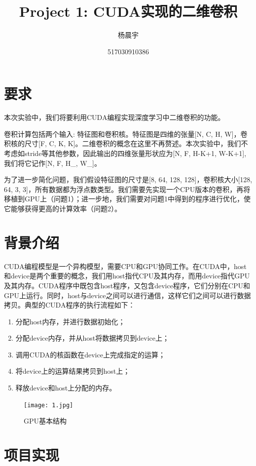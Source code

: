 \documentclass{article}
\title{Project 1: CUDA实现的二维卷积}
\author{杨晨宇}
\date{517030910386}
\begin{document}
\maketitle

\section{要求}
本次实验中，我们将要利用CUDA编程实现深度学习中二维卷积的功能。

卷积计算包括两个输入: 特征图和卷积核。特征图是四维的张量[N, C, H, W]，卷积核的尺寸[F, C, K, K]。二维卷积的概念在这里不再赘述。本次实验中，我们不考虑如stride等其他参数，因此输出的四维张量形状应为[N, F, H-K+1, W-K+1], 我们将它记作[N, F, H\_, W\_]。

为了进一步简化问题，我们假设特征图的尺寸是[8, 64, 128, 128]，卷积核大小[128, 64, 3, 3]，所有数据都为浮点数类型。我们需要先实现一个CPU版本的卷积，再将移植到GPU上（问题1）；进一步地，我们需要对问题1中得到的程序进行优化，使它能够获得更高的计算效率（问题2）。


\section{背景介绍}
CUDA编程模型是一个异构模型，需要CPU和GPU协同工作。在CUDA中，host和device是两个重要的概念，我们用host指代CPU及其内存，而用device指代GPU及其内存。CUDA程序中既包含host程序，又包含device程序，它们分别在CPU和GPU上运行。同时，host与device之间可以进行通信，这样它们之间可以进行数据拷贝。典型的CUDA程序的执行流程如下：
\begin{enumerate}
	\item 分配host内存，并进行数据初始化；
	\item 分配device内存，并从host将数据拷贝到device上；
	\item 调用CUDA的核函数在device上完成指定的运算；
	\item 将device上的运算结果拷贝到host上；
	\item 释放device和host上分配的内存。
\end{enumerate}
\begin{figure}[h]
	\centering
	\texttt{[image: 1.jpg]}
	\caption{GPU基本结构}
	\label{fig:gpu}
\end{figure}


\section{项目实现}
\end{document}

